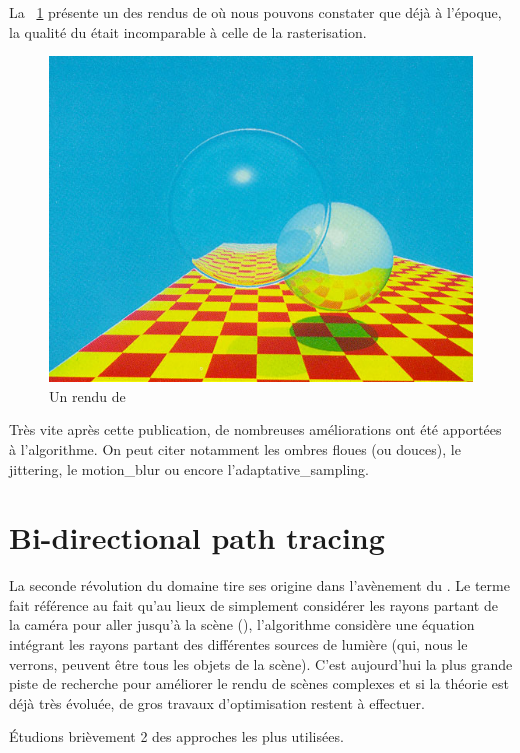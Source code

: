 La \ \ref{fig:firstRendering} présente un des rendus de
\cite{Whitted1980} où nous pouvons constater que déjà à l'époque, la qualité
du \raytracing{} était incomparable à celle de la rasterisation.
\begin{figure}
\begin{center}
  \includegraphics[width=.8\textwidth]{img/1980_Raytracing.jpg}
  \caption{Un rendu de \cite{Whitted1980}\label{fig:firstRendering}}
\end{center}
\end{figure}

Très vite après cette publication, de nombreuses améliorations ont été
apportées à l'algorithme. On peut citer notamment les ombres floues (ou
douces), le \gls{jittering}, le \gls{motion_blur} ou encore
l'\gls{adaptative_sampling}.

\section{Bi-directional path tracing}
La seconde révolution du domaine tire ses origine dans l'avènement du
. Le terme fait référence au fait qu'au
lieux de simplement considérer les rayons partant de la caméra pour aller
jusqu'à la scène (), l'algorithme considère une équation
intégrant les rayons partant des différentes sources de lumière (qui, nous le
verrons, peuvent être tous les objets de la scène). C'est aujourd'hui la plus
grande piste de recherche pour améliorer le rendu de scènes complexes et si la
théorie est déjà très évoluée, de gros travaux d'optimisation restent à
effectuer.

Étudions brièvement 2 des approches les plus utilisées.

